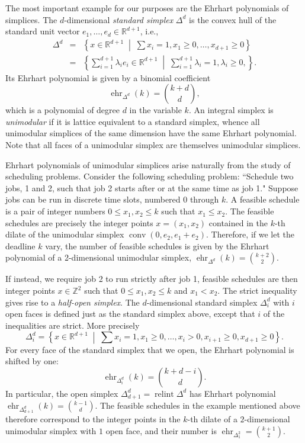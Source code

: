 \documentclass[12pt,reqno]{amsart}
\numberwithin{definition}{section}
\theoremstyle{definition}
\newcommand{\RR}{\mathbb{R}}
\newcommand{\ZZ}{\mathbb{Z}}
\newcommand{\ehr}{\operatorname{ehr}}
\newcommand{\conv}{\operatorname{conv}}
\newcommand{\relint}{\operatorname{relint}}
\newcommand{\mset}[2]{ \left\{ #1 \; \middle| \; #2 \right\}}
\begin{document}
The most important example for our purposes are the Ehrhart polynomials of simplices. The $d$-dimensional \emph{standard simplex} $\Delta^d$ is the convex hull of the standard unit vector $e_1,\ldots,e_d\in\RR^{d+1}$, i.e.,
\begin{eqnarray*}
  \Delta^d &=& \mset{x\in\RR^{d+1}}{\sum x_i =1, x_1 \geq 0, \ldots, x_{d+1} \geq 0} \\
  &=& \mset{\sum_{i=1}^{d+1} \lambda_i e_i\in\RR^{d+1}}{\sum_{i=1}^{d+1} \lambda_i = 1, \lambda_i\geq 0, }.
\end{eqnarray*}
Its Ehrhart polynomial is given by a binomial coefficient
\[
  \ehr_{\Delta^d}(k) = \binom{k+d}{d},
\]
which is a polynomial of degree $d$ in the variable $k$. An integral simplex is \emph{unimodular} if it is lattice equivalent to a standard simplex, whence all unimodular simplices of the same dimension have the same Ehrhart polynomial. Note that all faces of a unimodular simplex are themselves unimodular simplices.

Ehrhart polynomials of unimodular simplices arise naturally from the study of scheduling problems. Consider the following scheduling problem: ``Schedule two jobs, 1 and 2, such that job 2 starts after or at the same time as job 1." Suppose jobs can be run in discrete time slots, numbered $0$ through $k$. A feasible schedule is a pair of integer numbers $0\leq x_1,x_2 \leq k$ such that $x_1 \leq x_2$. The feasible schedules are precisely the integer points $x=(x_1,x_2)$ contained in the $k$-th dilate of the unimodular simplex $\conv(0,e_2,e_1+e_2)$. Therefore, if we let the deadline $k$ vary, the number of feasible schedules is given by the Ehrhart polynomial of a 2-dimensional unimodular simplex, $\ehr_{\Delta^d}(k)=\binom{k+2}{2}$.

If instead, we require job 2 to run strictly after job 1, feasible schedules are then integer points $x\in\ZZ^2$ such that $0\leq x_1,x_2 \leq k$ and $x_1 < x_2$. The strict inequality gives rise to a \emph{half-open simplex}. The $d$-dimensional standard simplex $\Delta^d_i$ with $i$ open faces is defined just as the standard simplex above, except that $i$ of the inequalities are strict. More precisely
\[
    \Delta^d_i = \mset{x\in\RR^{d+1}}{\sum x_i =1, x_1 \geq 0, \ldots, x_i > 0, x_{i+1} \geq 0, x_{d+1} \geq 0}.
\]
For every face of the standard simplex that we open, the Ehrhart polynomial is shifted by one:
\[
  \ehr_{\Delta^d_i}(k) = \binom{k+d-i}{d}.
\]
In particular, the open simplex $\Delta^d_{d+1} = \relint{\Delta^d}$ has Ehrhart polynomial $\ehr_{\Delta^d_{d+1}}(k) = \binom{k-1}{d}$. The feasible schedules in the example mentioned above therefore correspond to the integer points in the $k$-th dilate of a $2$-dimensional unimodular simplex with $1$ open face, and their number is $\ehr_{\Delta^2_1} = \binom{k+1}{2}$.
\end{document}
